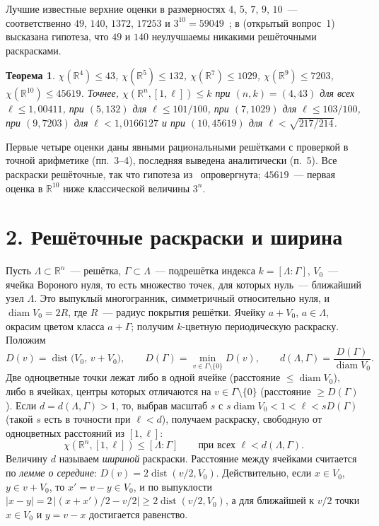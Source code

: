 \documentclass{article}
\theoremstyle{plain}
\newtheorem{theorem}{Теорема}
\theoremstyle{remark}
\newcommand{\R}{\mathbb{R}}
\newcommand{\diam}{\operatorname{diam}}
\newcommand{\dist}{\operatorname{dist}}
\begin{document}
Лучшие известные верхние оценки в размерностях $4$, $5$, $7$, $9$, $10$~---
соответственно $49$, $140$, $1372$, $17253$ и $3^{10}=59049$~\cite{ABPR}; в
\cite{ABPR} (открытый вопрос~1) высказана гипотеза, что $49$ и $140$
неулучшаемы никакими решёточными раскрасками.

\begin{theorem}\label{thm:main}
$\chi(\R^4)\le43$, $\chi(\R^5)\le132$, $\chi(\R^7)\le1029$,
$\chi(\R^9)\le7203$, $\chi(\R^{10})\le45619$. Точнее,
$\chi(\R^n,[1,\ell])\le k$ при $(n,k)=(4,43)$ для всех $\ell\le1{,}00411$,
при $(5,132)$ для $\ell\le101/100$, при $(7,1029)$ для $\ell\le103/100$,
при $(9,7203)$ для $\ell<1{,}0166127$ и при $(10,45619)$ для
$\ell<\sqrt{217/214}$.
\end{theorem}

Первые четыре оценки даны явными рациональными решётками с проверкой в
точной арифметике (пп.~3--4), последняя выведена аналитически (п.~5).
Все раскраски решёточные, так что гипотеза из~\cite{ABPR} опровергнута;
$45619$~--- первая оценка в $\R^{10}$ ниже классической величины $3^n$.

\section*{2. Решёточные раскраски и ширина}

Пусть $\Lambda\subset\R^n$~--- решётка, $\Gamma\subset\Lambda$~---
подрешётка индекса $k=[\Lambda:\Gamma]$, $V_0$~--- ячейка Вороного нуля,
то есть множество точек, для которых нуль~--- ближайший узел $\Lambda$. Это
выпуклый многогранник, симметричный относительно нуля, и $\diam V_0=2R$,
где $R$~--- радиус покрытия решётки. Ячейку $a+V_0$, $a\in\Lambda$, окрасим
цветом класса $a+\Gamma$; получим $k$-цветную периодическую раскраску.
Положим
\begin{equation}\label{eq:defs}
D(v)=\dist\bigl(V_0,\,v+V_0\bigr),\qquad
D(\Gamma)=\min_{v\in\Gamma\setminus\{0\}}D(v),\qquad
d(\Lambda,\Gamma)=\frac{D(\Gamma)}{\diam V_0}.
\end{equation}
Две одноцветные точки лежат либо в одной ячейке (расстояние
$\le\diam V_0$), либо в ячейках, центры которых отличаются на
$v\in\Gamma\setminus\{0\}$ (расстояние $\ge D(\Gamma)$). Если
$d=d(\Lambda,\Gamma)>1$, то, выбрав масштаб $s$ с
$s\diam V_0<1<\ell<sD(\Gamma)$ (такой $s$ есть в точности при $\ell<d$),
получаем раскраску, свободную от одноцветных расстояний из $[1,\ell]$:
\begin{equation}\label{eq:crit}
\chi(\R^n,[1,\ell])\le[\Lambda:\Gamma]\qquad\text{при всех }\ell<d(\Lambda,\Gamma).
\end{equation}
Величину $d$ называем \emph{шириной} раскраски. Расстояние между ячейками
считается по \emph{лемме о середине}: $D(v)=2\dist(v/2,V_0)$. Действительно,
если $x\in V_0$, $y\in v+V_0$, то $x'=v-y\in V_0$, и по выпуклости
$|x-y|=2\,|(x+x')/2-v/2|\ge2\dist(v/2,V_0)$, а для ближайшей к $v/2$
точки $x\in V_0$ и $y=v-x$ достигается равенство.
\end{document}

